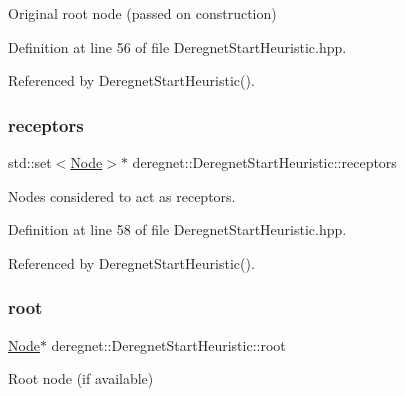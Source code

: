 Original root node (passed on construction) 



Definition at line 56 of file Deregnet\+Start\+Heuristic.\+hpp.



Referenced by Deregnet\+Start\+Heuristic().

\mbox{\label{classderegnet_1_1DeregnetStartHeuristic_ab80c046ff2b7c64086fceb84987b3e50}} 
\subsubsection{\texorpdfstring{receptors}{receptors}}
{\footnotesize\ttfamily std\+::set$<$\hyperlink{namespacederegnet_a744bad34f2de9856d36715a445f027f3}{Node}$>$$\ast$ deregnet\+::\+Deregnet\+Start\+Heuristic\+::receptors\hspace{0.3cm}{\ttfamily [protected]}}



Nodes considered to act as \textquotesingle{}receptors\textquotesingle{}. 



Definition at line 58 of file Deregnet\+Start\+Heuristic.\+hpp.



Referenced by Deregnet\+Start\+Heuristic().

\mbox{\label{classderegnet_1_1DeregnetStartHeuristic_a4605d41352e3adf1f9f9f32466a4e61e}} 
\subsubsection{\texorpdfstring{root}{root}}
{\footnotesize\ttfamily \hyperlink{namespacederegnet_a744bad34f2de9856d36715a445f027f3}{Node}$\ast$ deregnet\+::\+Deregnet\+Start\+Heuristic\+::root\hspace{0.3cm}{\ttfamily [protected]}}



Root node (if available) 



